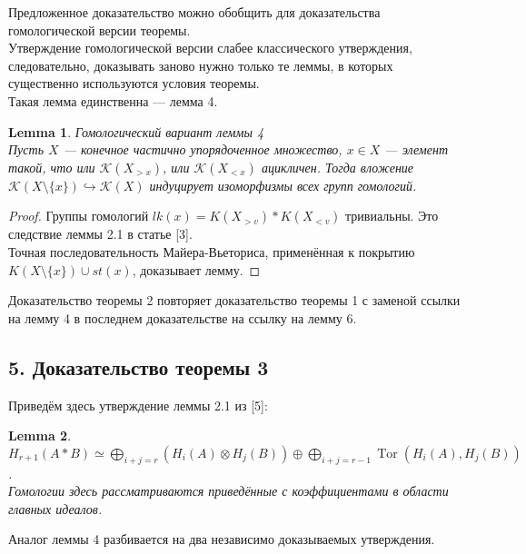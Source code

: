 \documentclass[a4paper, 12pt]{article}
\newtheorem{lemma}{Lemma}
\theoremstyle{definition}
\theoremstyle{remark}
\begin{document}
Предложенное доказательство можно обобщить для доказательства гомологической версии теоремы.\\
Утверждение гомологической версии слабее классического утверждения, следовательно, доказывать заново нужно только те леммы, в которых существенно используются условия теоремы.\\
Такая лемма единственна --- лемма 4.

\begin{lemma}
  \textit{Гомологический вариант леммы 4}\\
  Пусть $X$ --- конечное частично упорядоченное множество, $x \in X$ --- элемент такой, что или $\mathcal{K}(X_{>x})$, или $\mathcal{K}(X_{<x})$ ацикличен. Тогда вложение $\mathcal{K}(X\setminus \{x\}) \hookrightarrow \mathcal{K}(X)$ индуцирует изоморфизмы всех групп гомологий.
\end{lemma}
\begin{proof}
  Группы гомологий $lk(x) = K(X_{>v}) * K(X_{<v})$ тривиальны. Это следствие леммы 2.1 в статье [3].\\
  Точная последовательность Майера-Вьеториса, применённая к покрытию $K(X \setminus \{x\}) \cup st(x)$, доказывает лемму.
\end{proof}

Доказательство теоремы 2 повторяет доказательство теоремы 1 с заменой ссылки на лемму 4 в последнем доказательстве на ссылку на лемму 6.

\subsection*{5. Доказательство теоремы 3}

Приведём здесь утверждение леммы 2.1 из [5]:\\
\begin{lemma}
  $H_{r+1}(A * B) \simeq \bigoplus_{i+j=r}(H_i(A) \otimes H_j(B)) \oplus \bigoplus_{i+j=r-1} \operatorname{Tor}(H_i(A),H_j(B))$.\\
  Гомологии здесь рассматриваются приведённые с коэффициентами в области главных идеалов.
\end{lemma}

Аналог леммы 4 разбивается на два независимо доказываемых утверждения.\\
\end{document}
